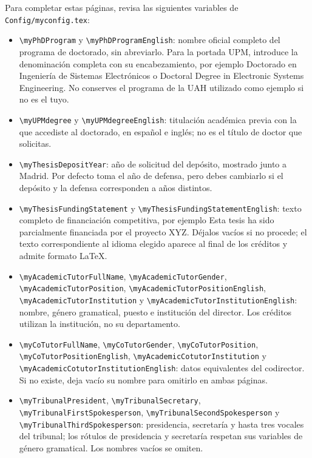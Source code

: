 Para completar estas páginas, revisa las siguientes variables de \texttt{Config/myconfig.tex}:

\begin{itemize}
  \item \texttt{\textbackslash{}myPhDProgram} y \texttt{\textbackslash{}myPhDProgramEnglish}: nombre oficial completo del programa de doctorado, sin abreviarlo. Para la portada UPM, introduce la denominación completa con su encabezamiento, por ejemplo Doctorado en Ingeniería de Sistemas Electrónicos o Doctoral Degree in Electronic Systems Engineering. No conserves el programa de la UAH utilizado como ejemplo si no es el tuyo.
  \item \texttt{\textbackslash{}myUPMdegree} y \texttt{\textbackslash{}myUPMdegreeEnglish}: titulación académica previa con la que accediste al doctorado, en español e inglés; no es el título de doctor que solicitas.
  \item \texttt{\textbackslash{}myThesisDepositYear}: año de solicitud del depósito, mostrado junto a Madrid. Por defecto toma el año de defensa, pero debes cambiarlo si el depósito y la defensa corresponden a años distintos.
  \item \texttt{\textbackslash{}myThesisFundingStatement} y \texttt{\textbackslash{}myThesisFundingStatementEnglish}: texto completo de financiación competitiva, por ejemplo Esta tesis ha sido parcialmente financiada por el proyecto XYZ. Déjalos vacíos si no procede; el texto correspondiente al idioma elegido aparece al final de los créditos y admite formato \LaTeX{}.
  \item \texttt{\textbackslash{}myAcademicTutorFullName}, \texttt{\textbackslash{}myAcademicTutorGender}, \texttt{\textbackslash{}myAcademicTutorPosition}, \texttt{\textbackslash{}myAcademicTutorPositionEnglish}, \texttt{\textbackslash{}myAcademicTutorInstitution} y \texttt{\textbackslash{}myAcademicTutorInstitutionEnglish}: nombre, género gramatical, puesto e institución del director. Los créditos utilizan la institución, no su departamento.
  \item \texttt{\textbackslash{}myCoTutorFullName}, \texttt{\textbackslash{}myCoTutorGender}, \texttt{\textbackslash{}myCoTutorPosition}, \texttt{\textbackslash{}myCoTutorPositionEnglish}, \texttt{\textbackslash{}myAcademicCotutorInstitution} y \texttt{\textbackslash{}myAcademicCotutorInstitutionEnglish}: datos equivalentes del codirector. Si no existe, deja vacío su nombre para omitirlo en ambas páginas.
  \item \texttt{\textbackslash{}myTribunalPresident}, \texttt{\textbackslash{}myTribunalSecretary}, \texttt{\textbackslash{}myTribunalFirstSpokesperson}, \texttt{\textbackslash{}myTribunalSecondSpokesperson} y \texttt{\textbackslash{}myTribunalThirdSpokesperson}: presidencia, secretaría y hasta tres vocales del tribunal; los rótulos de presidencia y secretaría respetan sus variables de género gramatical. Los nombres vacíos se omiten.

\end{itemize}
